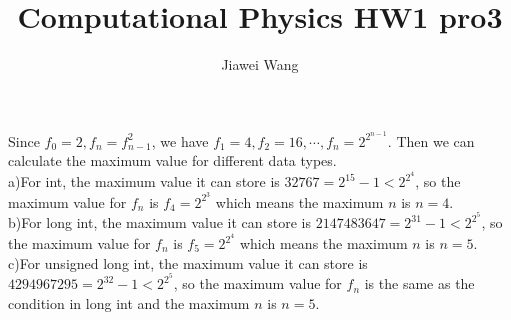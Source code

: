 \documentclass[a4paper,12pt]{article}
\begin{document}
\title{Computational Physics HW1 pro3}
\author{Jiawei Wang}
\date{}
\maketitle

\noindent Since $f_0=2, f_n=f_{n-1}^2$, we have $f_1=4, f_2=16, \cdots, f_n=2^{2^{n-1}}$. Then we can calculate the maximum value for different data types.\\
a)For int, the maximum value it can store is $32767=2^15-1<2^{2^4}$, so the maximum value for $f_n$ is $f_4=2^{2^3}$ which means the maximum $n$ is $n=4$.\\
b)For long int, the maximum value it can store is $2147483647=2^31-1<2^{2^5}$, so the maximum value for $f_n$ is $f_5=2^{2^4}$ which means the maximum $n$ is $n=5$.\\
c)For unsigned long int, the maximum value it can store is $4294967295=2^32-1<2^{2^5}$, so the maximum value for $f_n$ is the same as the condition in long int and the maximum $n$ is $n=5$.
\end{document}
